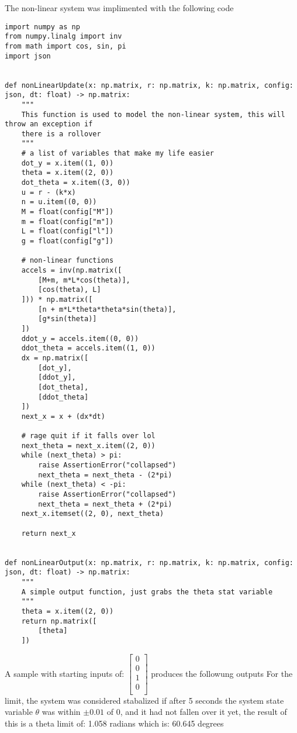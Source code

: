 The non-linear system was implimented with the following code
\begin{verbatim}
import numpy as np
from numpy.linalg import inv
from math import cos, sin, pi
import json


def nonLinearUpdate(x: np.matrix, r: np.matrix, k: np.matrix, config: json, dt: float) -> np.matrix:
    """
    This function is used to model the non-linear system, this will throw an exception if
    there is a rollover
    """
    # a list of variables that make my life easier
    dot_y = x.item((1, 0))
    theta = x.item((2, 0))
    dot_theta = x.item((3, 0))
    u = r - (k*x)
    n = u.item((0, 0))
    M = float(config["M"])
    m = float(config["m"])
    L = float(config["l"])
    g = float(config["g"])

    # non-linear functions
    accels = inv(np.matrix([
        [M+m, m*L*cos(theta)],
        [cos(theta), L]
    ])) * np.matrix([
        [n + m*L*theta*theta*sin(theta)],
        [g*sin(theta)]
    ])
    ddot_y = accels.item((0, 0))
    ddot_theta = accels.item((1, 0))
    dx = np.matrix([
        [dot_y],
        [ddot_y],
        [dot_theta],
        [ddot_theta]
    ])
    next_x = x + (dx*dt)

    # rage quit if it falls over lol
    next_theta = next_x.item((2, 0))
    while (next_theta) > pi:
        raise AssertionError("collapsed")
        next_theta = next_theta - (2*pi)
    while (next_theta) < -pi:
        raise AssertionError("collapsed")
        next_theta = next_theta + (2*pi)
    next_x.itemset((2, 0), next_theta)

    return next_x


def nonLinearOutput(x: np.matrix, r: np.matrix, k: np.matrix, config: json, dt: float) -> np.matrix:
    """
    A simple output function, just grabs the theta stat variable
    """
    theta = x.item((2, 0))
    return np.matrix([
        [theta]
    ])
\end{verbatim}
A sample with starting inputs of: $\begin{bmatrix}
0\\
0\\
1\\
0\\
\end{bmatrix}
$ produces the followung outputs
For the limit, the system was considered stabalized if after 5 seconds the system state variable $\theta$ was within $\pm0.01$ of 0, and it had not fallen over it yet, the result of this is a theta limit of: 1.058 radians which is: 60.645 degrees
